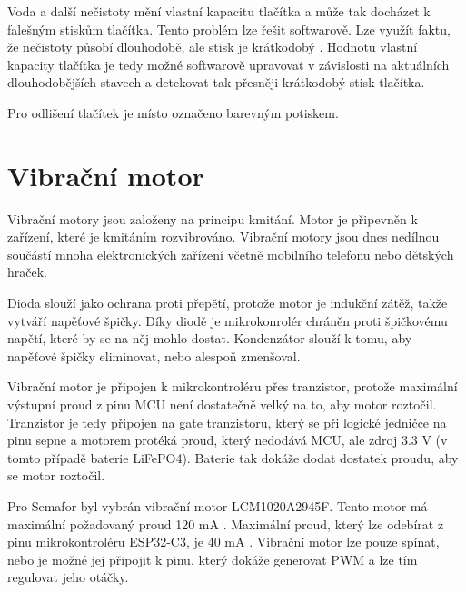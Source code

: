 Voda a další nečistoty mění vlastní kapacitu tlačítka a může tak docházet k falešným stiskům tlačítka. Tento problém lze řešit softwarově. 
Lze využít faktu, že nečistoty působí dlouhodobě, ale stisk je krátkodobý \cite{PrincipKapTl}. Hodnotu vlastní kapacity tlačítka je tedy
možné softwarově upravovat v závislosti na aktuálních dlouhodobějších stavech a detekovat tak přesněji krátkodobý stisk tlačítka.



Pro odlišení tlačítek je místo označeno barevným potiskem. 

\section{Vibrační motor}
Vibrační motory jsou založeny na principu kmitání. Motor je připevněn k zařízení, které je kmitáním rozvibrováno. Vibrační motory jsou dnes 
nedílnou součástí mnoha elektronických zařízení včetně mobilního telefonu nebo dětských hraček. 

Dioda slouží jako ochrana proti přepětí, protože motor je indukční zátěž, takže vytváří napěťové špičky. Díky diodě je mikrokonrolér chráněn 
proti špičkovému napětí, které by se na něj mohlo dostat. Kondenzátor slouží k tomu, aby napěťové špičky eliminovat, nebo alespoň zmenšoval. 

Vibrační motor je připojen k mikrokontroléru přes tranzistor, protože maximální výstupní proud z pinu MCU není dostatečně velký na to, aby 
motor roztočil. Tranzistor je tedy připojen na gate tranzistoru, který se při logické jedničce na pinu sepne a motorem protéká proud, který 
nedodává MCU, ale zdroj 3.3 V (v tomto případě baterie LiFePO4). Baterie tak dokáže dodat dostatek proudu, aby se motor roztočil. 

Pro Semafor byl vybrán vibrační motor LCM1020A2945F. Tento motor má maximální požadovaný proud 120 mA \cite{vib_motor_dtsh}. Maximální proud, 
který lze odebírat z pinu mikrokontroléru ESP32-C3, je 40 mA \cite{ESP_C3_dtsh}. Vibrační motor lze pouze spínat, nebo je možné jej připojit 
k pinu, který dokáže generovat PWM a lze tím regulovat jeho otáčky. 

